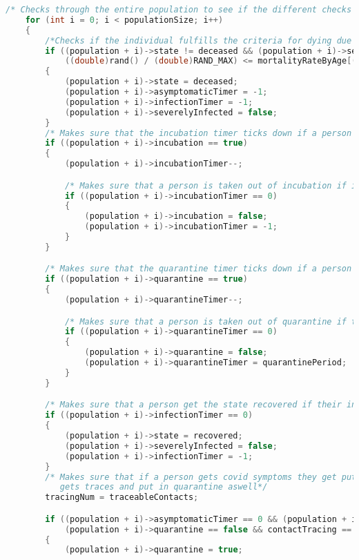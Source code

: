 \begin{lstlisting}[language=c, caption={Our simulations written in c}, captionpos=b, label={snippet:LABELNAVN}]
    /* Checks through the entire population to see if the different checks or timers apply for each person*/
    for (int i = 0; i < populationSize; i++)
    {
        /*Checks if the individual fulfills the criteria for dying due to covid*/
        if ((population + i)->state != deceased && (population + i)->severelyInfected == true && (population + i)->incubation == false &&
            ((double)rand() / (double)RAND_MAX) <= mortalityRateByAge[(population + i)->age] / avgInfectionPeriod)
        {
            (population + i)->state = deceased;
            (population + i)->asymptomaticTimer = -1;
            (population + i)->infectionTimer = -1;
            (population + i)->severelyInfected = false;
        }
        /* Makes sure that the incubation timer ticks down if a person is in incubation*/
        if ((population + i)->incubation == true)
        {
            (population + i)->incubationTimer--;

            /* Makes sure that a person is taken out of incubation if incubation timer reaches 0*/
            if ((population + i)->incubationTimer == 0)
            {
                (population + i)->incubation = false;
                (population + i)->incubationTimer = -1;
            }
        }

        /* Makes sure that the quarantine timer ticks down if a person is in quarantine*/
        if ((population + i)->quarantine == true)
        {
            (population + i)->quarantineTimer--;

            /* Makes sure that a person is taken out of quarantine if the quarantine timer reaches 0*/
            if ((population + i)->quarantineTimer == 0)
            {
                (population + i)->quarantine = false;
                (population + i)->quarantineTimer = quarantinePeriod;
            }
        }

        /* Makes sure that a person get the state recovered if their infection timer reaches 0*/
        if ((population + i)->infectionTimer == 0)
        {
            (population + i)->state = recovered;
            (population + i)->severelyInfected = false;
            (population + i)->infectionTimer = -1;
        }
        /* Makes sure that if a person gets covid symptoms they get put in quarantine and their tracable contacts 
           gets traces and put in quarantine aswell*/
        tracingNum = traceableContacts;

        if ((population + i)->asymptomaticTimer == 0 && (population + i)->state == infected &&
            (population + i)->quarantine == false && contactTracing == true && time >= contactTracingStartTime)
        {
            (population + i)->quarantine = true;


\end{lstlisting}
